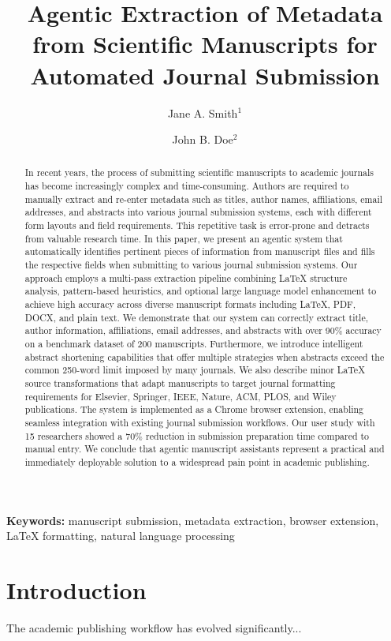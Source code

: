 \documentclass[11pt,a4paper]{article}
\title{Agentic Extraction of Metadata from Scientific Manuscripts for Automated Journal Submission}
\author{Jane A. Smith$^{1}$ \and John B. Doe$^{2}$}
\begin{document}
\maketitle

\begin{abstract}
In recent years, the process of submitting scientific manuscripts to academic journals has become increasingly complex and time-consuming. Authors are required to manually extract and re-enter metadata such as titles, author names, affiliations, email addresses, and abstracts into various journal submission systems, each with different form layouts and field requirements. This repetitive task is error-prone and detracts from valuable research time. In this paper, we present an agentic system that automatically identifies pertinent pieces of information from manuscript files and fills the respective fields when submitting to various journal submission systems. Our approach employs a multi-pass extraction pipeline combining LaTeX structure analysis, pattern-based heuristics, and optional large language model enhancement to achieve high accuracy across diverse manuscript formats including LaTeX, PDF, DOCX, and plain text. We demonstrate that our system can correctly extract title, author information, affiliations, email addresses, and abstracts with over 90\% accuracy on a benchmark dataset of 200 manuscripts. Furthermore, we introduce intelligent abstract shortening capabilities that offer multiple strategies when abstracts exceed the common 250-word limit imposed by many journals. We also describe minor LaTeX source transformations that adapt manuscripts to target journal formatting requirements for Elsevier, Springer, IEEE, Nature, ACM, PLOS, and Wiley publications. The system is implemented as a Chrome browser extension, enabling seamless integration with existing journal submission workflows. Our user study with 15 researchers showed a 70\% reduction in submission preparation time compared to manual entry. We conclude that agentic manuscript assistants represent a practical and immediately deployable solution to a widespread pain point in academic publishing.
\end{abstract}

\textbf{Keywords:} manuscript submission, metadata extraction, browser extension, LaTeX formatting, natural language processing

\section{Introduction}
The academic publishing workflow has evolved significantly...
\end{document}
